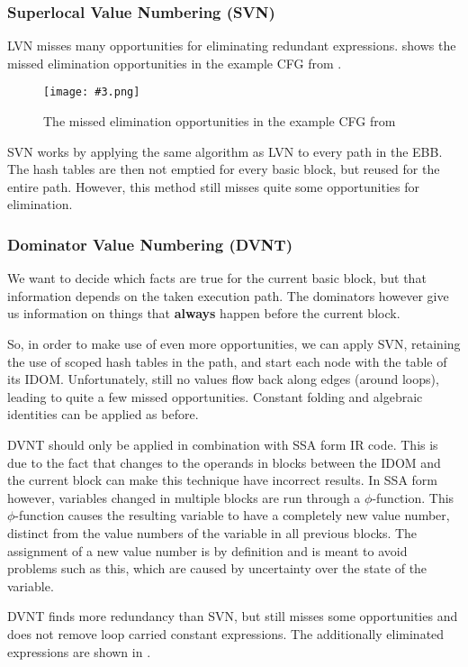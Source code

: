 \documentclass{article}
\newcommand{\fig}[4]{
	\begin{figure}[#1]
		\center
		\texttt{[image: \#3.png]}
		\caption{#4}
		\label{fig:#3}
	\end{figure}
	}
\begin{document}
\subsubsection{Superlocal Value Numbering (SVN)}
LVN misses many opportunities for eliminating redundant expressions.
 shows the missed elimination opportunities in the example CFG from .

\fig{h}{0.7}{missedops}{The missed elimination opportunities in the example CFG from \Cref{cfg}}

SVN works by applying the same algorithm as LVN to every path in the EBB.
The hash tables are then not emptied for every basic block, but reused for the entire path.
However, this method still misses quite some opportunities for elimination.

\subsubsection{Dominator Value Numbering (DVNT)}
We want to decide which facts are true for the current basic block, but that information depends on the taken execution path.
The dominators however give us information on things that \textbf{always} happen before the current block.

So, in order to make use of even more opportunities, we can apply SVN, retaining the use of scoped hash tables in the path, and start each node with the table of its IDOM.
Unfortunately, still no values flow back along edges (around loops), leading to quite a few missed opportunities.
Constant folding and algebraic identities can be applied as before.

DVNT should only be applied in combination with SSA form IR code.
This is due to the fact that changes to the operands in blocks between the IDOM and the current block can make this technique have incorrect results.
In SSA form however, variables changed in multiple blocks are run through a $\phi$-function.
This $\phi$-function causes the resulting variable to have a completely new value number, distinct from the value numbers of the variable in all previous blocks.
The assignment of a new value number is by definition and is meant to avoid problems such as this, which are caused by uncertainty over the state of the variable.

DVNT finds more redundancy than SVN, but still misses some opportunities and does not remove loop carried constant expressions.
The additionally eliminated expressions are shown in .
\end{document}
